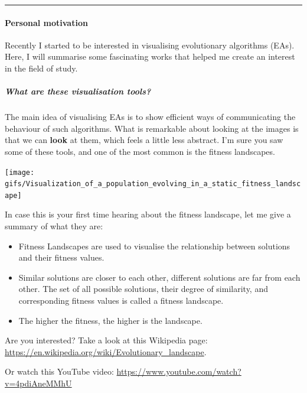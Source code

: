 \documentclass[
]{article}
\providecommand{\tightlist}{%
  \setlength{\itemsep}{0pt}\setlength{\parskip}{0pt}}
\begin{document}
\begin{center}\rule{0.5\linewidth}{0.5pt}\end{center}

\hypertarget{personal-motivation}{%
\paragraph{Personal motivation}\label{personal-motivation}}

Recently I started to be interested in visualising evolutionary
algorithms (EAs). Here, I will summarise some fascinating works that
helped me create an interest in the field of study.

\hypertarget{what-are-these-visualisation-tools}{%
\subparagraph{What are these visualisation
tools?}\label{what-are-these-visualisation-tools}}

The main idea of visualising EAs is to show efficient ways of
communicating the behaviour of such algorithms. What is remarkable about
looking at the images is that we can \textbf{look} at them, which feels
a little less abstract. I'm sure you saw some of these tools, and one of
the most common is the fitness landscapes.

\begin{center}\texttt{[image: gifs/Visualization\_of\_a\_population\_evolving\_in\_a\_static\_fitness\_landscape]} \end{center}

In case this is your first time hearing about the fitness landscape, let
me give a summary of what they are:

\begin{itemize}
\tightlist
\item
  Fitness Landscapes are used to visualise the relationship between
  solutions and their fitness values.
\item
  Similar solutions are closer to each other, different solutions are
  far from each other. The set of all possible solutions, their degree
  of similarity, and corresponding fitness values is called a fitness
  landscape.
\item
  The higher the fitness, the higher is the landscape.
\end{itemize}

Are you interested? Take a look at this Wikipedia page:
\url{https://en.wikipedia.org/wiki/Evolutionary_landscape}.

Or watch this YouTube video:
\url{https://www.youtube.com/watch?v=4pdiAneMMhU}
\end{document}
